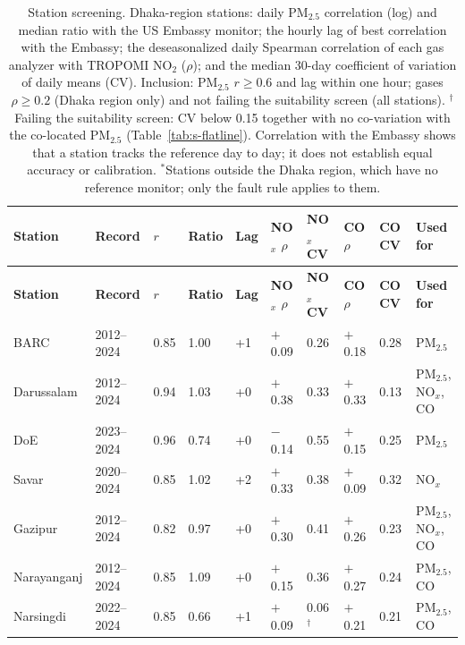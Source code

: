 \begingroup\footnotesize
\begin{longtable}{L{2.9cm} C{1.4cm} C{1.0cm} C{1.0cm} C{0.9cm} C{1.2cm} C{1.1cm} C{1.2cm} C{1.1cm} L{2.2cm}}
\caption{Station screening. Dhaka-region stations: daily PM$_{2.5}$ correlation (log) and median ratio with the US Embassy monitor; the hourly lag of best correlation with the Embassy; the deseasonalized daily Spearman correlation of each gas analyzer with TROPOMI NO$_2$ ($\rho$); and the median 30-day coefficient of variation of daily means (CV). Inclusion: PM$_{2.5}$ $r\geq0.6$ and lag within one hour; gases $\rho\geq0.2$ (Dhaka region only) and not failing the suitability screen (all stations). $^{\dagger}$Failing the suitability screen: CV below 0.15 together with no co-variation with the co-located PM$_{2.5}$ (Table~\ref{tab:s-flatline}). Correlation with the Embassy shows that a station tracks the reference day to day; it does not establish equal accuracy or calibration. $^{*}$Stations outside the Dhaka region, which have no reference monitor; only the fault rule applies to them.}\label{tab:s-screening}\\
\toprule
\textbf{Station} & \textbf{Record} & \textbf{$r$} & \textbf{Ratio} & \textbf{Lag} & \textbf{NO$_x$ $\rho$} & \textbf{NO$_x$ CV} & \textbf{CO $\rho$} & \textbf{CO CV} & \textbf{Used for} \\
\midrule\endfirsthead
\toprule
\textbf{Station} & \textbf{Record} & \textbf{$r$} & \textbf{Ratio} & \textbf{Lag} & \textbf{NO$_x$ $\rho$} & \textbf{NO$_x$ CV} & \textbf{CO $\rho$} & \textbf{CO CV} & \textbf{Used for} \\
\midrule\endhead
\bottomrule\endfoot
BARC & 2012--2024 & 0.85 & 1.00 & +1 & $+$0.09 & 0.26 & $+$0.18 & 0.28 & PM$_{2.5}$ \\
Darussalam & 2012--2024 & 0.94 & 1.03 & +0 & $+$0.38 & 0.33 & $+$0.33 & 0.13 & PM$_{2.5}$, NO$_x$, CO \\
DoE & 2023--2024 & 0.96 & 0.74 & +0 & $-$0.14 & 0.55 & $+$0.15 & 0.25 & PM$_{2.5}$ \\
Savar & 2020--2024 & 0.85 & 1.02 & +2 & $+$0.33 & 0.38 & $+$0.09 & 0.32 & NO$_x$ \\
Gazipur & 2012--2024 & 0.82 & 0.97 & +0 & $+$0.30 & 0.41 & $+$0.26 & 0.23 & PM$_{2.5}$, NO$_x$, CO \\
Narayanganj & 2012--2024 & 0.85 & 1.09 & +0 & $+$0.15 & 0.36 & $+$0.27 & 0.24 & PM$_{2.5}$, CO \\
Narsingdi & 2022--2024 & 0.85 & 0.66 & +1 & $+$0.09 & 0.06$^{\dagger}$ & $+$0.21 & 0.21 & PM$_{2.5}$, CO \\

\end{longtable}
